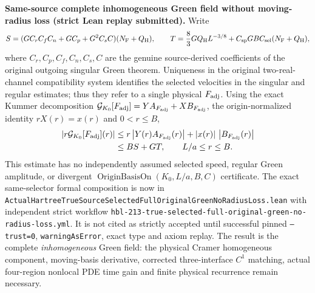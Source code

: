 \documentclass[11pt]{amsart}
\begin{document}
\medskip
\noindent\textbf{Same-source complete inhomogeneous Green field
without moving-radius loss (strict Lean replay submitted).}
Write
\[
 S=(G C_r C_f C_n+G C_p+G^2C_sC)(N_{\rm F}+Q_{\rm H}),
 \qquad
 T=\frac83 GQ_{\rm H}L^{-3/8}
   +C_{\rm sp}GBC_{\rm sel}(N_{\rm F}+Q_{\rm H}),
\]
where $C_r,C_p,C_f,C_n,C_s,C$ are the genuine source-derived
coefficients of the original outgoing singular Green theorem.
Uniqueness in the original two-real-channel compatibility system
identifies the selected velocities in the singular and regular
estimates; thus they refer to a single physical $F_{\rm adj}$.
Using the exact Kummer decomposition
$\mathcal G_{K_0}[F_{\rm adj}]=
Y A_{F_{\rm adj}}+X B_{F_{\rm adj}}$,
the origin-normalized identity $rX(r)=x(r)$ and $0<r\le B$,
\begin{align}
 \left|r\mathcal G_{K_0}[F_{\rm adj}](r)\right|
 &\le r\left|Y(r)A_{F_{\rm adj}}(r)\right|
       +|x(r)|\,\left|B_{F_{\rm adj}}(r)\right|
       \notag\\
 &\le B S+G T,\qquad L/a\le r\le B.
 \label{eq:original-true-selected-whole-green-no-loss}
\end{align}
This estimate has no independently assumed selected speed,
regular Green amplitude, or divergent
$\operatorname{OriginBasisOn}(K_0,L/a,B,C)$ certificate.
The exact same-selector formal composition is now in
\texttt{ActualHartreeTrueSourceSelectedFullOriginalGreenNoRadiusLoss.lean}
with independent strict workflow
\texttt{hbl-213-true-selected-full-original-green-no-radius-loss.yml}.
It is not cited as strictly accepted until successful pinned
\texttt{--trust=0}, \texttt{warningAsError}, exact type and axiom
replay. The result is the complete \emph{inhomogeneous} Green field:
the physical Cramer homogeneous component, moving-basis derivative,
corrected three-interface $C^1$ matching, actual four-region
nonlocal PDE time gain and finite physical recurrence remain necessary.
\end{document}
